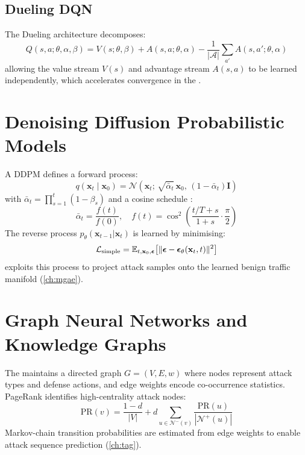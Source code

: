 \subsection{Dueling DQN}
The Dueling architecture \citep{wang2016} decomposes:
\begin{equation}
  Q(s,a;\theta,\alpha,\beta) = V(s;\theta,\beta)
    + A(s,a;\theta,\alpha) - \frac{1}{|\mathcal{A}|}\sum_{a'} A(s,a';\theta,\alpha)
\end{equation}
allowing the value stream $V(s)$ and advantage stream $A(s,a)$ to be learned
independently, which accelerates convergence in the \adpn{}.

\section{Denoising Diffusion Probabilistic Models}

A DDPM \citep{ho2020} defines a forward process:
\begin{equation}
  q(\mathbf{x}_t \mid \mathbf{x}_0) = \mathcal{N}
    \!\left(\mathbf{x}_t;\, \sqrt{\bar\alpha_t}\,\mathbf{x}_0,\,
    (1-\bar\alpha_t)\mathbf{I}\right)
  \label{eq:ddpm_forward}
\end{equation}
with $\bar\alpha_t = \prod_{s=1}^t (1 - \beta_s)$ and a cosine schedule
\citep{nichol2021}:
\begin{equation}
  \bar\alpha_t = \frac{f(t)}{f(0)},\quad
  f(t) = \cos^2\!\left(\frac{t/T + s}{1+s} \cdot \frac{\pi}{2}\right)
\end{equation}
The reverse process $p_\theta(\mathbf{x}_{t-1}|\mathbf{x}_t)$ is learned
by minimising:
\begin{equation}
  \mathcal{L}_{\mathrm{simple}} = \mathbb{E}_{t,\mathbf{x}_0,\boldsymbol\epsilon}
    \!\left[\|\boldsymbol\epsilon - \boldsymbol\epsilon_\theta(\mathbf{x}_t,t)\|^2\right]
\end{equation}
\mgae{} exploits this process to project attack samples onto the learned
benign traffic manifold (\cref{ch:mgae}).

\section{Graph Neural Networks and Knowledge Graphs}

The \tagraph{} maintains a directed graph $G = (V, E, w)$ where nodes represent
attack types and defense actions, and edge weights encode co-occurrence
statistics. PageRank \citep{page1999} identifies high-centrality attack
nodes:
\begin{equation}
  \mathrm{PR}(v) = \frac{1-d}{|V|} + d \sum_{u \in \mathcal{N}^-(v)}
    \frac{\mathrm{PR}(u)}{|\mathcal{N}^+(u)|}
\end{equation}
Markov-chain transition probabilities are estimated from edge weights to
enable attack sequence prediction (\cref{ch:tag}).
